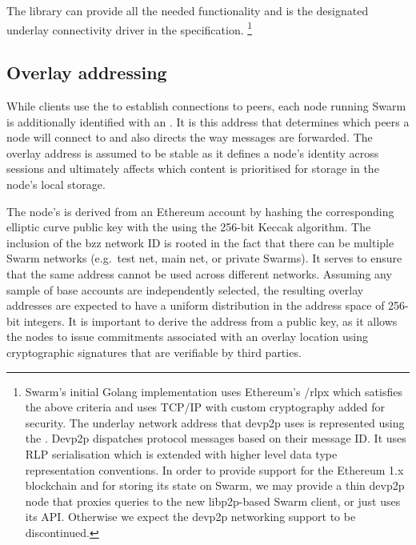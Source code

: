 The  library can provide all the needed functionality and is the designated underlay connectivity driver in the specification.%
%
\footnote{Swarm's initial Golang implementation uses Ethereum's /rlpx which satisfies the above criteria and uses TCP/IP with custom cryptography added for security. The underlay network address that devp2p uses is represented using the . Devp2p dispatches protocol messages based on their message ID. It uses RLP serialisation which is extended with higher level data type representation conventions. In order to provide support for the Ethereum 1.x blockchain and for storing its state on Swarm, we may provide a thin devp2p node that proxies queries to the new libp2p-based Swarm client, or just uses its API. Otherwise we expect the devp2p networking support to be discontinued.}

\subsection{Overlay addressing\statusgreen}\label{sec:overlay-addressing} 
\green{}

While clients use the  to establish connections to peers, each node running Swarm is additionally identified with an . It is this address that determines which peers a node will connect to and also directs the way messages are forwarded. The overlay address is assumed to be stable as it defines a node's identity across sessions and ultimately affects which content is prioritised for storage in the node's local storage.

The node's  is derived from an Ethereum account by hashing the corresponding elliptic curve public key with the  using the 256-bit Keccak algorithm. The inclusion of the bzz network ID is rooted in the fact that there can be multiple Swarm networks (e.g.\ test net, main net, or private Swarms). It serves to ensure that the same address cannot be used across different networks. Assuming any sample of base accounts are independently selected, the resulting overlay addresses are expected to have a uniform distribution in the address space of 256-bit integers. It is important to derive the address from a public key, as it allows the nodes to issue commitments associated with an overlay location using cryptographic signatures that are verifiable by third parties. 

